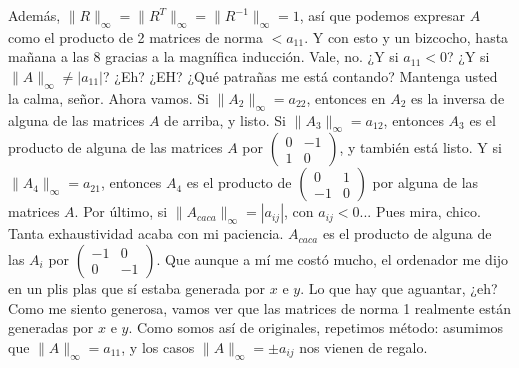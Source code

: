 \documentclass{article}
\newcommand\tab[1][0.6cm]{\hspace*{#1}}
\newcommand\nl{\newline\tab}
\begin{document}
	Además, $\|R\|_\infty = \|R^T\|_\infty = \|R^{-1}\|_\infty= 1$, así que podemos expresar $A$ como el producto de 2 matrices de norma $< a_{11}$.\nl\nl
	Y con esto y un bizcocho, hasta mañana a las 8 gracias a la magnífica inducción. \nl
	Vale, no. ¿Y si $a_{11} < 0$? ¿Y si $\|A\|_\infty \neq |a_{11}|$? ¿Eh? ¿EH? ¿Qué patrañas me está contando? \nl
	Mantenga usted la calma, señor. Ahora vamos.\nl\nl
	Si $\|A_2\|_\infty = a_{22}$, entonces en $A_2$ es la inversa de alguna de las matrices $A$ de arriba, y listo.\nl
	Si $\|A_3\|_\infty = a_{12}$, entonces $A_3$ es el producto de alguna de las matrices $A$ por
	$\begin{pmatrix}
	0 & -1 \\
	1 & 0 
	\end{pmatrix} $,
	y también está listo.\nl 
	Y si $\|A_4\|_\infty = a_{21}$, entonces $A_4$ es el producto de
	$\begin{pmatrix}
	0 & 1 \\
	-1 & 0 
	\end{pmatrix} $ por alguna de las matrices $A$.\nl
	Por último, si $\|A_{caca}\|_\infty = |a_{ij}|$, con $a_{ij} < 0$... Pues mira, chico. Tanta exhaustividad acaba con mi paciencia. $A_{caca}$ es el producto de alguna de las $A_i$ por  $\begin{pmatrix}
	-1 & 0 \\
	0 & -1 
	\end{pmatrix} $. Que aunque a mí me costó mucho, el ordenador me dijo en un plis plas que sí estaba generada por $x$ e $y$.\nl 
	Lo que hay que aguantar, ¿eh?\nl 
	Como me siento generosa, vamos ver que las matrices de norma 1 realmente están generadas por $x$ e $y$.
	Como somos así de originales, repetimos método: asumimos que $\|A\|_\infty = a_{11}$, y los casos $\|A\|_\infty = \pm a_{ij}$ nos vienen de regalo.
\end{document}
